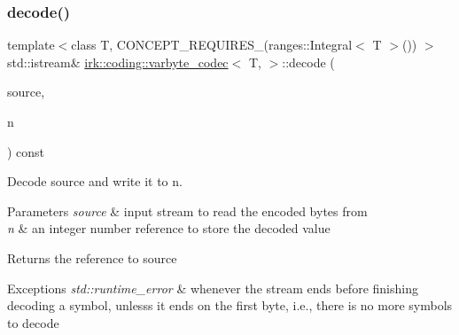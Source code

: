 \subsubsection{\texorpdfstring{decode()}{decode()}}
{\footnotesize\ttfamily template$<$class T, C\+O\+N\+C\+E\+P\+T\+\_\+\+R\+E\+Q\+U\+I\+R\+E\+S\+\_\+(ranges\+::\+Integral$<$ T $>$()) $>$ \\
std\+::istream\& \mbox{\hyperlink{structirk_1_1coding_1_1varbyte__codec}{irk\+::coding\+::varbyte\+\_\+codec}}$<$ T, $>$\+::decode (\begin{DoxyParamCaption}\item[{std\+::istream \&}]{source,  }\item[{\mbox{\hyperlink{structirk_1_1coding_1_1varbyte__codec_addad40df722d08275853597cbe8e178b}{value\+\_\+type}} \&}]{n }\end{DoxyParamCaption}) const\hspace{0.3cm}{\ttfamily [inline]}}



Decode {\ttfamily source} and write it to {\ttfamily n}. 


\begin{DoxyParams}{Parameters}
{\em source} & input stream to read the encoded bytes from \\
\hline
{\em n} & an integer number reference to store the decoded value \\
\hline
\end{DoxyParams}
\begin{DoxyReturn}{Returns}
the reference to {\ttfamily source} 
\end{DoxyReturn}

\begin{DoxyExceptions}{Exceptions}
{\em std\+::runtime\+\_\+error} & whenever the stream ends before finishing decoding a symbol, unlesss it ends on the first byte, i.\+e., there is no more symbols to decode \\
\hline
\end{DoxyExceptions}
\mbox{\label{structirk_1_1coding_1_1varbyte__codec_a330889102c7d1c2213eba270ee64e2f5}} 
